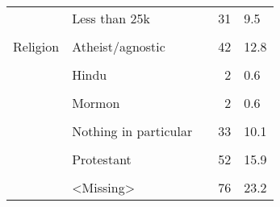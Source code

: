 \documentclass[border=1mm]{standalone}
\begin{document}
\begin{table}[!h]
\begin{tabular}[t]{lllrl}
 & Less than 25k &  & 31 & 9.5\\
\addlinespace
\cellcolor{gray!10}{} & \cellcolor{gray!10}{<Missing>} & \cellcolor{gray!10}{} & \cellcolor{gray!10}{75} & \cellcolor{gray!10}{22.9}\\
Religion & Atheist/agnostic &  & 42 & 12.8\\
\cellcolor{gray!10}{} & \cellcolor{gray!10}{Buddhist} & \cellcolor{gray!10}{} & \cellcolor{gray!10}{2} & \cellcolor{gray!10}{0.6}\\
 & Hindu &  & 2 & 0.6\\
\cellcolor{gray!10}{} & \cellcolor{gray!10}{Jewish} & \cellcolor{gray!10}{} & \cellcolor{gray!10}{6} & \cellcolor{gray!10}{1.8}\\
\addlinespace
 & Mormon &  & 2 & 0.6\\
\cellcolor{gray!10}{} & \cellcolor{gray!10}{Muslim} & \cellcolor{gray!10}{} & \cellcolor{gray!10}{4} & \cellcolor{gray!10}{1.2}\\
 & Nothing in particular &  & 33 & 10.1\\
\cellcolor{gray!10}{} & \cellcolor{gray!10}{Orthodox (Greek or Russian)} & \cellcolor{gray!10}{} & \cellcolor{gray!10}{1} & \cellcolor{gray!10}{0.3}\\
 & Protestant &  & 52 & 15.9\\
\addlinespace
\cellcolor{gray!10}{} & \cellcolor{gray!10}{Roman Catholic} & \cellcolor{gray!10}{} & \cellcolor{gray!10}{108} & \cellcolor{gray!10}{32.9}\\
 & <Missing> &  & 76 & 23.2\\
\bottomrule
\end{tabular}
\end{table}
\end{document}

